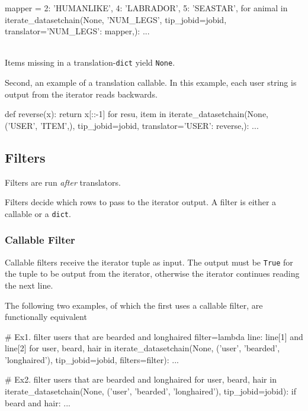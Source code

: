 \begin{python}
mapper = {2: 'HUMANLIKE', 4: 'LABRADOR', 5: 'SEASTAR',}
for animal in iterate_datasetchain(None, 'NUM_LEGS', tip_jobid=jobid,
                                     translator={'NUM_LEGS': mapper,}):
    ...
\end{python}
\\
Items missing in a translation-\texttt{dict} yield \texttt{None}.

Second, an example of a translation callable.  In this example, each
user string is output from the iterator reads backwards.

\begin{python}
def reverse(x):
    return x[::-1]
for resu, item in iterate_datasetchain(None, ('USER', 'ITEM',), tip_jobid=jobid,
                                       translator={'USER': reverse,}):
    ...
\end{python}



\subsection{Filters}

Filters are run \emph{after} translators.

Filters decide which rows to pass to the iterator output.  A filter is
either a callable or a \texttt{dict}.


\subsubsection*{Callable Filter}

Callable filters receive the iterator tuple as input.  The output must
be \texttt{True} for the tuple to be output from the iterator,
otherwise the iterator continues reading the next line.

The following two examples, of which the first uses a callable filter,
are functionally equivalent

\begin{python}
# Ex1.  filter users that are bearded and longhaired
filter=lambda line: line[1] and line[2]
for user, beard, hair in iterate_datasetchain(None, ('user', 'bearded', 'longhaired'),
                                       tip_jobid=jobid, filters=filter):
    ...

# Ex2.  filter users that are bearded and longhaired
for user, beard, hair in iterate_datasetchain(None, ('user', 'bearded', 'longhaired'),
                                       tip_jobid=jobid):
    if beard and hair:
        ...
\end{python}





